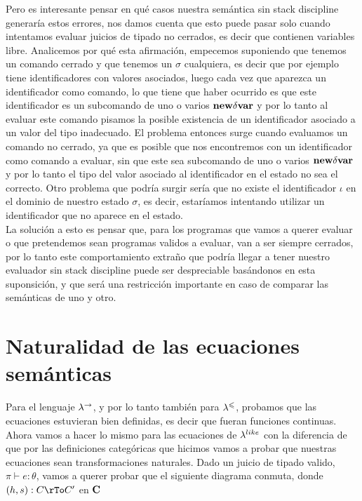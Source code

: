 Pero es interesante pensar en qu\'e casos nuestra sem\'antica sin
stack discipline generar\'ia estos errores, nos damos cuenta que esto puede pasar
solo cuando intentamos evaluar juicios de tipado no cerrados, es decir que 
contienen variables libre. Analicemos por qu\'e esta afirmaci\'on, empecemos
suponiendo que tenemos un comando cerrado y que tenemos un $\sigma$ cualquiera,
es decir que por ejemplo tiene identificadores con valores asociados, luego
cada vez que aparezca un identificador como comando, lo que tiene que haber ocurrido
es que este identificador es un subcomando de uno o varios $\textbf{new} \delta \textbf{var}$ y por lo
tanto al evaluar este comando pisamos la posible existencia de un identificador
asociado a un valor del tipo inadecuado. El problema entonces surge cuando evaluamos
un comando no cerrado, ya que es posible que nos encontremos con un identificador
como comando a evaluar, sin que este sea subcomando de uno o varios $\textbf{new} \delta \textbf{var}$
y por lo tanto el tipo del valor asociado al identificador en el estado no sea el 
correcto. Otro problema que podr\'ia surgir ser\'ia que no existe el identificador
$\iota$ en el dominio de nuestro estado $\sigma$, es decir, estar\'iamos intentando
utilizar un identificador que no aparece en el estado.\\

La soluci\'on a esto es pensar que, para los programas que vamos a
querer evaluar o que pretendemos sean programas validos a evaluar, van a ser siempre
cerrados, por lo tanto este comportamiento extraño que podr\'ia llegar
a tener nuestro evaluador sin stack discipline puede ser despreciable bas\'andonos
en esta suponsici\'on, y que ser\'a una restricci\'on importante en caso de comparar
las sem\'anticas de uno y otro.

\section{Naturalidad de las ecuaciones sem\'anticas}

Para el lenguaje $\lambda^{\rightarrow}$, y por lo tanto tambi\'en para $\lambda^{\leqslant}$, probamos
que las ecuaciones estuvieran bien definidas, es decir que fueran funciones continuas.
Ahora vamos a hacer lo mismo para las ecuaciones de $\lambda^{like}$ con la diferencia de que
por las definiciones categ\'oricas que hicimos vamos a probar que nuestras ecuaciones
sean transformaciones naturales. Dado un juicio de tipado valido, $\pi \vdash e : \theta$,
vamos a querer probar que el siguiente diagrama conmuta, donde $(h,s):C \rTo C'$ en $\textbf{C}$


